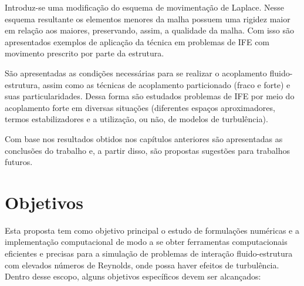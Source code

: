 {         Introduz-se uma modificação do esquema de movimentação de Laplace. Nesse esquema resultante os elementos menores da malha possuem uma rigidez maior em relação aos maiores, preservando, assim, a qualidade da malha. Com isso são apresentados exemplos de aplicação da técnica em problemas de IFE com movimento prescrito por parte da estrutura.

         São apresentadas as condições necessárias para se realizar o acoplamento fluido-estrutura, assim como as técnicas de acoplamento particionado (fraco e forte) e suas particularidades. Dessa forma são estudados problemas de IFE por meio do acoplamento forte em diversas situações (diferentes espaços aproximadores, termos estabilizadores e a utilização, ou não, de modelos de turbulência).

         Com base nos resultados obtidos nos capítulos anteriores são apresentadas as conclusões do trabalho e, a partir disso, são propostas sugestões para trabalhos futuros.
    }




\section{Objetivos}

Esta proposta tem como objetivo principal o estudo de formulações numéricas e a implementação computacional de modo a se obter ferramentas computacionais eficientes e precisas para a simulação de problemas de interação fluido-estrutura com elevados números de Reynolds, onde possa haver efeitos de turbulência. Dentro desse escopo, alguns objetivos específicos devem ser alcançados:

